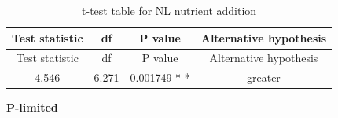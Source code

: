 \documentclass[]{article}
\begin{document}
\begin{longtable}[]{@{}cccc@{}}
\caption{t-test table for NL nutrient addition}\tabularnewline
\toprule
\begin{minipage}[b]{0.21\columnwidth}\centering\strut
Test statistic\strut
\end{minipage} & \begin{minipage}[b]{0.07\columnwidth}\centering\strut
df\strut
\end{minipage} & \begin{minipage}[b]{0.16\columnwidth}\centering\strut
P value\strut
\end{minipage} & \begin{minipage}[b]{0.30\columnwidth}\centering\strut
Alternative hypothesis\strut
\end{minipage}\tabularnewline
\midrule
\endfirsthead
\toprule
\begin{minipage}[b]{0.21\columnwidth}\centering\strut
Test statistic\strut
\end{minipage} & \begin{minipage}[b]{0.07\columnwidth}\centering\strut
df\strut
\end{minipage} & \begin{minipage}[b]{0.16\columnwidth}\centering\strut
P value\strut
\end{minipage} & \begin{minipage}[b]{0.30\columnwidth}\centering\strut
Alternative hypothesis\strut
\end{minipage}\tabularnewline
\midrule
\endhead
\begin{minipage}[t]{0.21\columnwidth}\centering\strut
4.546\strut
\end{minipage} & \begin{minipage}[t]{0.07\columnwidth}\centering\strut
6.271\strut
\end{minipage} & \begin{minipage}[t]{0.16\columnwidth}\centering\strut
0.001749 * *\strut
\end{minipage} & \begin{minipage}[t]{0.30\columnwidth}\centering\strut
greater\strut
\end{minipage}\tabularnewline
\bottomrule
\end{longtable}

\textbf{P-limited}
\end{document}
